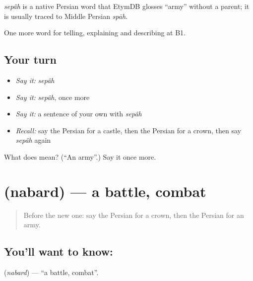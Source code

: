 \begin{cousinweb}
\emph{sepâh} is a native Persian word that EtymDB glosses \textquotedblleft{}army\textquotedblright{} without a parent; it is usually traced to Middle Persian \emph{spāh}.
\end{cousinweb}

\begin{grammarlens}[title={What you've built}]
One more word for telling, explaining and describing at B1.
\end{grammarlens}

\subsection*{Your turn}
\begin{itemize}
\raggedright
  \item \emph{Say it:} \emph{sepâh}
  \item \emph{Say it:} \emph{sepâh}, once more
  \item \emph{Say it:} a sentence of your own with \emph{sepâh}
  \item \emph{Recall:} say the Persian for a castle, then the Persian for a crown, then say \emph{sepâh} again
\end{itemize}

\begin{tcolorbox}[breakable,colback=teal!4,colframe=teal!35!black,title={Before you move on}]
What does  mean? (\textquotedblleft{}An army\textquotedblright{}.) Say it once more.
\end{tcolorbox}
\section[\texorpdfstring{\fa{نبرد} (nabard)}{نبرد (nabard)}]{ (nabard) — a battle, combat}

\label{lesson:FA-C351-nabard}



\begin{quote}
Before the new one: say the Persian for a crown, then the Persian for an army.
\end{quote}

\subsection*{You'll want to know: }
\textbf{} (\emph{nabard}) — \textquotedblleft{}a battle, combat\textquotedblright{}.

